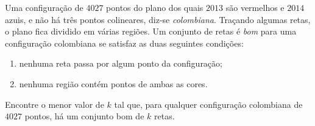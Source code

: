 Uma configuração de $4027$ pontos do plano dos quais $2013$ são vermelhos e $2014$ azuis, e não há três pontos colineares, diz-se \emph{colombiana}.
Traçando algumas retas, o plano fica dividido em várias regiões.
Um conjunto de retas é \emph{bom} para uma configuração colombiana se satisfaz as duas seguintes condições:

\begin{enumerate}[label = (\roman*)]
	\item nenhuma reta passa por algum ponto da configuração;
	\item nenhuma região contém pontos de ambas as cores.
\end{enumerate}

Encontre o menor valor de $k$ tal que, para qualquer configuração colombiana de $4027$ pontos, há um conjunto bom de $k$ retas.
